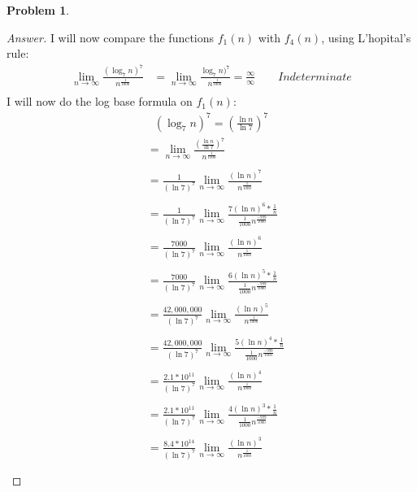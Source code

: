 \documentclass[11pt]{article}
\theoremstyle{definition}
\theoremstyle{definition}
\newtheorem{required}{Problem}
\theoremstyle{definition}
\begin{document}
\begin{required}
\begin{enumerate} [label=(\alph*)]
\begin{proof}[Answer]
I will now compare the functions $f_1(n)$ with $f_4(n)$, using L'hopital's rule: \\
\begin{align*}
\lim_{n \to \infty} \frac{(\log_7 n)^7}{n^\frac{1}{1000}} &= \lim_{n \to \infty} \frac{\log_7 n)^7}{n^\frac{1}{1000}}  = \frac{\infty}{\infty} \qquad Indeterminate  \\
\end{align*}
I will now do the log base formula on $f_1(n)$: \\
\begin{align*}
(\log_7n)^{7} = (\frac{\ln n}{\ln 7})^{7}
\end{align*}
\begin{align*}
&= \lim_{n \to \infty} \frac{(\frac{\ln n}{\ln 7})^{7}}{n^{\frac{1}{1000}}} \\ 
\\
&= \frac{1}{(\ln 7)^{7}}\lim_{n \to \infty} \frac{(\ln n)^{7}}{n^{\frac{1}{1000}}} \\ 
\\
&= \frac{1}{(\ln 7)^{7}}\lim_{n \to \infty} \frac{7(\ln n)^{6} * \frac{1}{n}}{\frac{1}{1000}n^{\frac{-999}{1000}}} \\
\\
&= \frac{7000}{(\ln 7)^{7}}\lim_{n \to \infty} \frac{(\ln n)^{6}}{n^{\frac{1}{1000}}} \\
\\
&= \frac{7000}{(\ln 7)^{7}}\lim_{n \to \infty} \frac{6(\ln n)^{5} * \frac{1}{n}}{\frac{1}{1000}n^{\frac{-999}{1000}}} \\
\\
&= \frac{42,000,000}{(\ln 7)^{7}}\lim_{n \to \infty} \frac{(\ln n)^{5}}{n^{\frac{1}{1000}}} \\
\\
&= \frac{42,000,000}{(\ln 7)^{7}}\lim_{n \to \infty} \frac{5(\ln n)^{4} * \frac{1}{n}}{\frac{1}{1000}n^{\frac{-999}{1000}}} \\
\\
&= \frac{2.1*10^{11}}{(\ln 7)^{7}}\lim_{n \to \infty} \frac{(\ln n)^{4}}{n^{\frac{1}{1000}}} \\
\\
&= \frac{2.1*10^{11}}{(\ln 7)^{7}}\lim_{n \to \infty} \frac{4(\ln n)^{3} * \frac{1}{n}}{\frac{1}{1000}n^{\frac{-999}{1000}}} \\
\\
&= \frac{8.4*10^{14}}{(\ln 7)^{7}}\lim_{n \to \infty} \frac{(\ln n)^{3}}{n^{\frac{1}{1000}}} \\
\\

\end{align*}
\end{proof}
\end{enumerate}
\end{required}
\end{document}
